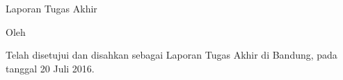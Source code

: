 \pagestyle{empty}
\begin{center}
\smallskip

    \Large \bfseries \MakeUppercase{\thetitle}
    \vfill

    \Large Laporan Tugas Akhir
    \vfill

    \large Oleh

    \Large \theauthor

    \vfill
    \normalsize \normalfont
    Telah disetujui dan disahkan sebagai Laporan Tugas Akhir di Bandung, pada tanggal 20 Juli 2016.

\end{center}
\clearpage
